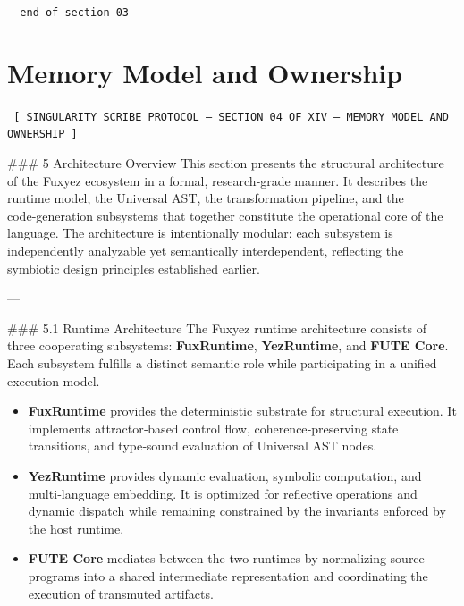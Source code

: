     \vspace{1cm}
    \begin{center}
    \color{alienPurple}\texttt{--- end of section 03 ---}
    \end{center}
    \clearpage
    

    \chapter*{Memory Model and Ownership}
    
    
    \begin{glyphbox}
    \centering
    \color{neonCyan}\fontsize{8}{10}\selectfont\texttt{
    [ SINGULARITY SCRIBE PROTOCOL -- SECTION 04 OF XIV -- MEMORY MODEL AND OWNERSHIP ]
    }
    \end{glyphbox}
    \vspace{0.3cm}
    
    
    \#\#\# 5 Architecture Overview  
This section presents the structural architecture of the Fuxyez ecosystem in a formal, research‑grade manner. It describes the runtime model, the Universal AST, the transformation pipeline, and the code‑generation subsystems that together constitute the operational core of the language. The architecture is intentionally modular: each subsystem is independently analyzable yet semantically interdependent, reflecting the symbiotic design principles established earlier.

---

\#\#\# 5.1 Runtime Architecture  
The Fuxyez runtime architecture consists of three cooperating subsystems: \textbf{FuxRuntime}, \textbf{YezRuntime}, and \textbf{FUTE Core}. Each subsystem fulfills a distinct semantic role while participating in a unified execution model.

\begin{itemize}
  \item \textbf{FuxRuntime} provides the deterministic substrate for structural execution. It implements attractor‑based control flow, coherence‑preserving state transitions, and type‑sound evaluation of Universal AST nodes.  
  \item \textbf{YezRuntime} provides dynamic evaluation, symbolic computation, and multi‑language embedding. It is optimized for reflective operations and dynamic dispatch while remaining constrained by the invariants enforced by the host runtime.  
  \item \textbf{FUTE Core} mediates between the two runtimes by normalizing source programs into a shared intermediate representation and coordinating the execution of transmuted artifacts.
\end{itemize}

